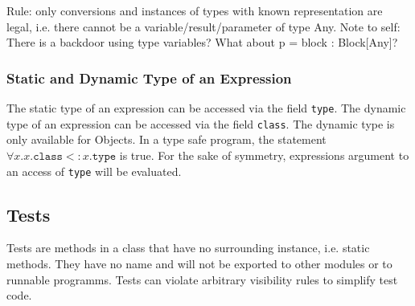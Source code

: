 Rule: only conversions and instances of types with known representation are legal, i.e. there cannot be a variable/result/parameter of type Any.
Note to self: There is a backdoor using type variables?
What about p = block : Block[Any]?

\subsubsection{Static and Dynamic Type of an Expression}

The static type of an expression can be accessed via the field \texttt{type}.
The dynamic type of an expression can be accessed via the field \texttt{class}.
The dynamic type is only available for Objects.
In a type safe program, the statement $\forall x. x\texttt{.class} <: x\texttt{.type}$ is true.
For the sake of symmetry, expressions argument to an access of \texttt{type} will be evaluated.

\subsection{Tests}

Tests are methods in a class that have no surrounding instance, i.e. static methods.
They have no name and will not be exported to other modules or to runnable programms.
Tests can violate arbitrary visibility rules to simplify test code.